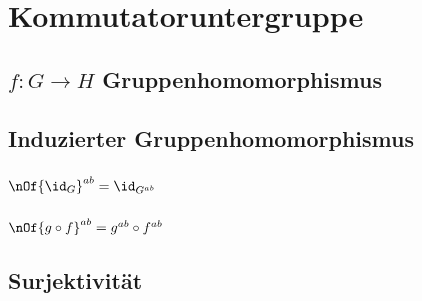 \section{Kommutatoruntergruppe}
\subsection{$f : G \to H$ Gruppenhomomorphismus}


\subsection{Induzierter Gruppenhomomorphismus}

\subsubsection{$\nOf{\id_G}^{ab} = \id_{G^{ab}}$}


\subsubsection{$\nOf{g\circ f}^{ab} = g^{ab}\circ f^{ab}$}


\subsection{Surjektivität}